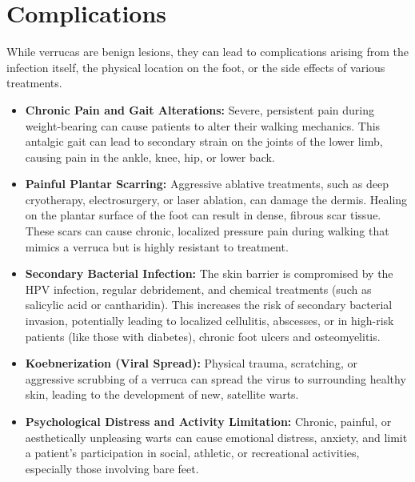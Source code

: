 \section*{Complications}
While verrucas are benign lesions, they can lead to complications arising from the infection itself, the physical location on the foot, or the side effects of various treatments.
\begin{itemize}
    \item \textbf{Chronic Pain and Gait Alterations:} Severe, persistent pain during weight-bearing can cause patients to alter their walking mechanics. This antalgic gait can lead to secondary strain on the joints of the lower limb, causing pain in the ankle, knee, hip, or lower back.
    \item \textbf{Painful Plantar Scarring:} Aggressive ablative treatments, such as deep cryotherapy, electrosurgery, or laser ablation, can damage the dermis. Healing on the plantar surface of the foot can result in dense, fibrous scar tissue. These scars can cause chronic, localized pressure pain during walking that mimics a verruca but is highly resistant to treatment.
    \item \textbf{Secondary Bacterial Infection:} The skin barrier is compromised by the HPV infection, regular debridement, and chemical treatments (such as salicylic acid or cantharidin). This increases the risk of secondary bacterial invasion, potentially leading to localized cellulitis, abscesses, or in high-risk patients (like those with diabetes), chronic foot ulcers and osteomyelitis.
    \item \textbf{Koebnerization (Viral Spread):} Physical trauma, scratching, or aggressive scrubbing of a verruca can spread the virus to surrounding healthy skin, leading to the development of new, satellite warts.
    \item \textbf{Psychological Distress and Activity Limitation:} Chronic, painful, or aesthetically unpleasing warts can cause emotional distress, anxiety, and limit a patient's participation in social, athletic, or recreational activities, especially those involving bare feet.
\end{itemize}

